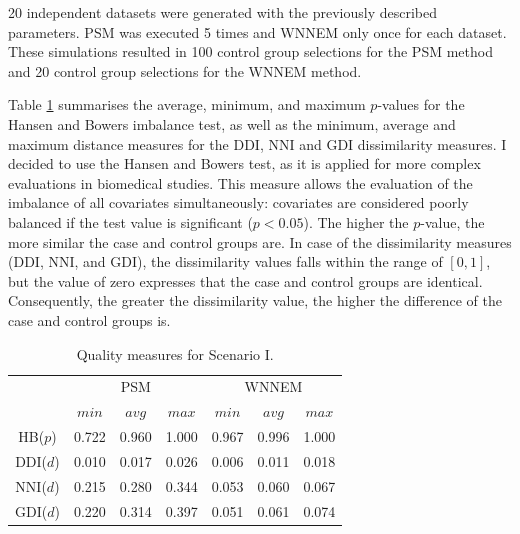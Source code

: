 		20 independent datasets were generated with the previously described parameters. PSM was executed 5 times and WNNEM only once for each dataset. These simulations resulted in 100 control group selections for the PSM method and 20 control group selections for the WNNEM method.
								
		Table \ref{tab:wnnem_scen_I_stat} summarises the average, minimum, and maximum $p$-values for the Hansen and Bowers imbalance test, as well as the minimum, average and maximum distance measures for the DDI, NNI and GDI dissimilarity measures. I decided to use the Hansen and Bowers test, as it is applied for more complex evaluations in biomedical studies. This measure allows the evaluation of the imbalance of all covariates simultaneously: covariates are considered poorly balanced if the test value is significant ($p<0.05$). The higher the $p$-value, the more similar the case and control groups are. In case of the dissimilarity measures (DDI, NNI, and GDI), the dissimilarity values falls within the range of $[0,1]$, but the value of zero expresses that the case and control groups are identical. Consequently, the greater the dissimilarity value, the higher the difference of the case and control groups is.
								
		\begin{table}[h]
			\caption{Quality measures for Scenario I.%
			}
			\label{tab:wnnem_scen_I_stat}
			\centering
			\begin{tabular}{ccccccc} 
				\toprule
				& \multicolumn{3}{c}{PSM} 
				& \multicolumn{3}{c}{WNNEM}\\
				         & $min$ & $avg$ & $max$ & $min$ & $avg$ & $max$ \\
				\midrule
				HB($p$)  & 0.722 & 0.960 & 1.000 & 0.967 & 0.996 & 1.000 \\
				DDI($d$) & 0.010 & 0.017 & 0.026 & 0.006 & 0.011 & 0.018 \\
				\midrule
				NNI($d$) & 0.215 & 0.280 & 0.344 & 0.053 & 0.060 & 0.067 \\
				GDI($d$) & 0.220 & 0.314 & 0.397 & 0.051 & 0.061 & 0.074 \\
				\bottomrule
			\end{tabular}
		\end{table}
								

